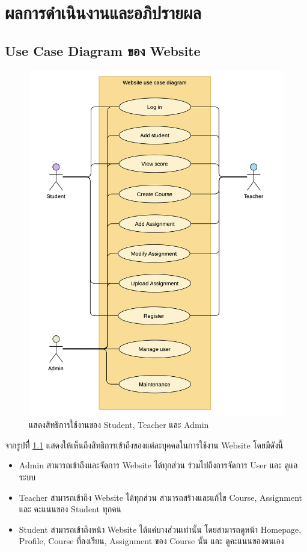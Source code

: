 \chapter{ผลการดำเนินงานและอภิปรายผล}
\label{chapter4}
\section{Use Case Diagram ของ Website}
\begin{figure}[H]
    \captionsetup{justification=centering}
    \centering
    \includegraphics[width=5.5in]{figures/chapter4/usecase.png}
    \caption{แสดงสิทธิการใช้งานของ Student, Teacher และ Admin}
    \label{figure:usecase}
\end{figure}
\newpage
\noindent จากรูปที่ี่ \ref{figure:usecase} แสดงให้เห็นถึงสิทธิการเข้าถึงของแต่ละบุคคลในการใช้งาน Website โดยมีดังนี้
\begin{itemize}
    \item Admin สามารถเข้าถึงและจัดการ Website ได้ทุกส่วน ร่วมไปถึงการจัดการ User และ ดูแลระบบ
    \item Teacher สามารถเข้าถึง Website ได้ทุกส่วน สามารถสร้างและแก้ไข Course, Assignment และ คะแนนของ Student ทุกคน
    \item Student สามารถเข้าถึงหน้า Website ได้แค่บางส่วนเท่านั้น โดยสามารถดูหน้า Homepage,  Profile, Course ที่ลงเรียน, Assignment ของ Course นั้น และ ดูคะแนนของตนเอง
\end{itemize}


